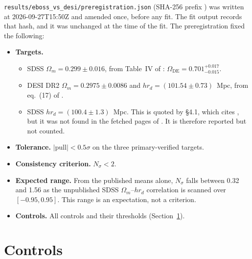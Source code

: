 \documentclass[11pt]{article}
\begin{document}
\texttt{results/eboss\_vs\_desi/preregistration.json} (SHA-256 prefix
\texttt{\PreregSha}) was written at 2026-09-27T15:50Z and amended once,
before any fit. The fit output records that hash, and it was unchanged at
the time of the fit. The preregistration fixed the following:
\begin{itemize}
\item \textbf{Targets.}
  \begin{itemize}
  \item SDSS $\Omega_m=0.299\pm0.016$, from Table~IV of \cite{alam2021}:
    $\Omega_\mathrm{DE}=0.701^{+0.017}_{-0.015}$.
  \item DESI DR2 $\Omega_m=0.2975\pm0.0086$ and
    $h r_d=(101.54\pm0.73)$~Mpc, from eq.~(17) of \cite{desi2025dr2}.
  \item SDSS $h r_d=(100.4\pm1.3)$~Mpc. This is quoted by \cite{desi2024vi}
    \S4.1, which cites \cite{alam2021}, but it was not found in the fetched
    pages of \cite{alam2021}. It is therefore reported but not counted.
  \end{itemize}
\item \textbf{Tolerance.} $|\mathrm{pull}|<0.5\sigma$ on the three
  primary-verified targets.
\item \textbf{Consistency criterion.} $N_\sigma<2$.
\item \textbf{Expected range.} From the published means alone, $N_\sigma$
  falls between 0.32 and 1.56 as the unpublished SDSS
  $\Omega_m$--$h r_d$ correlation is scanned over $[-0.95,0.95]$. This range
  is an expectation, not a criterion.
\item \textbf{Controls.} All controls and their thresholds
  (Section~\ref{sec:controls}).
\end{itemize}

\section{Controls}\label{sec:controls}
\end{document}
